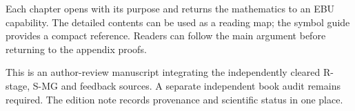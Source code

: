 Each chapter opens with its purpose and returns the mathematics to an EBU capability. The detailed contents can be used as a reading map; the symbol guide provides a compact reference. Readers can follow the main argument before returning to the appendix proofs.

This is an author-review manuscript integrating the independently cleared R-stage, S-MG and feedback sources. A separate independent book audit remains required. The edition note records provenance and scientific status in one place.
